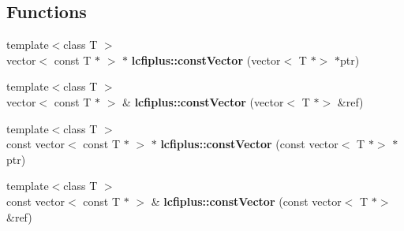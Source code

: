\subsection*{Functions}
\begin{DoxyCompactItemize}
\item 
{\footnotesize template$<$class T $>$ }\\vector$<$ const T $\ast$ $>$ $\ast$ \textbf{ lcfiplus\+::const\+Vector} (vector$<$ T $\ast$$>$ $\ast$ptr)
\item 
{\footnotesize template$<$class T $>$ }\\vector$<$ const T $\ast$ $>$ \& \textbf{ lcfiplus\+::const\+Vector} (vector$<$ T $\ast$$>$ \&ref)
\item 
{\footnotesize template$<$class T $>$ }\\const vector$<$ const T $\ast$ $>$ $\ast$ \textbf{ lcfiplus\+::const\+Vector} (const vector$<$ T $\ast$$>$ $\ast$ptr)
\item 
{\footnotesize template$<$class T $>$ }\\const vector$<$ const T $\ast$ $>$ \& \textbf{ lcfiplus\+::const\+Vector} (const vector$<$ T $\ast$$>$ \&ref)
\end{DoxyCompactItemize}
